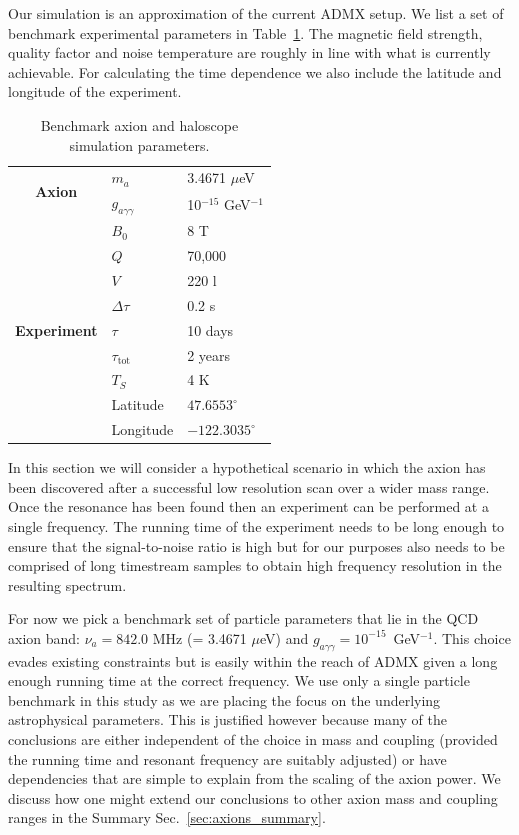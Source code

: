 Our simulation is an approximation of the current ADMX setup. We list a set of benchmark experimental parameters in Table~\ref{tab:partable}. The magnetic field strength, quality factor and noise temperature are roughly in line with what is currently achievable. For calculating the time dependence we also include the latitude and longitude of the experiment.

\begin{table}[t]\centering
\begin{tabularx}{0.8\textwidth}{c|ll}
    \hline \hline
\multirow{2}{*}{\bf Axion}
		& $m_a$ & 3.4671 $\mu$eV \\ 
		& $g_{a\gamma\gamma}$ & 10$^{-15}$ GeV$^{-1}$ \\ \hline 
\multirow{9}{*}{\bf Experiment}
		& $B_0$ & 8 T \\
		& $Q$ & 70,000 \\
		& $V$ & 220 l \\
		& $\Delta \tau$ & 0.2 s \\
		& $\tau$  & 10 days \\
		& $\tau_\textrm{tot}$ & 2 years \\
		& $T_S$ & 4 K \\
		& Latitude & $47.6553^\circ$ \\
		& Longitude & $-122.3035^\circ$ \\
		\hline \hline
    \end{tabularx}
  \caption{Benchmark axion and haloscope simulation parameters.}
\label{tab:partable}
\end{table}

In this section we will consider a hypothetical scenario in which the axion has been discovered after a successful low resolution scan over a wider mass range. Once the resonance has been found then an experiment can be performed at a single frequency. The running time of the experiment needs to be long enough to ensure that the signal-to-noise ratio is high but for our purposes also needs to be comprised of long timestream samples to obtain high frequency resolution in the resulting spectrum. 

For now we pick a benchmark set of particle parameters that lie in the QCD axion band: $\nu_a = 842.0$ MHz (= 3.4671 $\mu$eV) and $g_{a\gamma\gamma} = 10^{-15}$~GeV$^{-1}$. This choice evades existing constraints but is easily within the reach of ADMX given a long enough running time at the correct frequency. We use only a single particle benchmark in this study as we are placing the focus on the underlying astrophysical parameters. This is justified however because many of the conclusions are either independent of the choice in mass and coupling (provided the running time and resonant frequency are suitably adjusted) or have dependencies that are simple to explain from the scaling of the axion power. We discuss how one might extend our conclusions to other axion mass and coupling ranges in the Summary Sec.~\ref{sec:axions_summary}.

